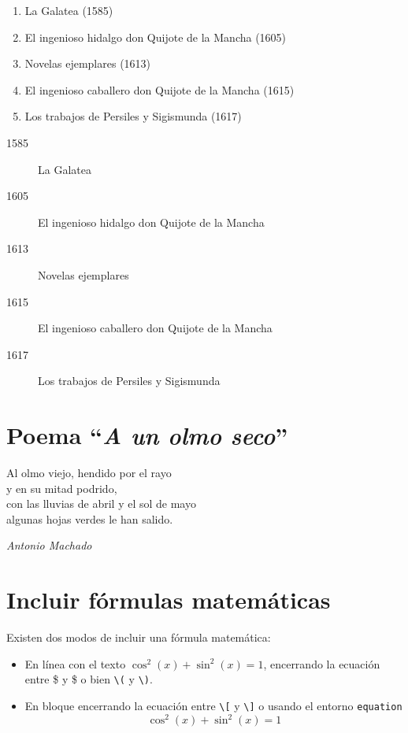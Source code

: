 \documentclass[a4paper, 12pt, twoside]{article} %
\begin{document}
\begin{enumerate}
  \item La Galatea (1585)
  \item El ingenioso hidalgo don Quijote de la Mancha (1605)
  \item Novelas ejemplares (1613)
  \item El ingenioso caballero don Quijote de la Mancha (1615)
  \item Los trabajos de Persiles y Sigismunda (1617)
\end{enumerate}

\begin{description}
  \item[1585] La Galatea 
  \item[1605] El ingenioso hidalgo don Quijote de la Mancha 
  \item[1613] Novelas ejemplares 
  \item[1615] El ingenioso caballero don Quijote de la Mancha 
  \item[1617] Los trabajos de Persiles y Sigismunda 
\end{description}
\section{Poema ``\emph{A un olmo seco}''}

\begin{flushleft}
Al olmo viejo, hendido por el rayo \\
y en su mitad podrido,\\
con las lluvias de abril y el sol de mayo\\
algunas hojas verdes le han salido.
\medskip

\emph{Antonio Machado}~\cite{machadoAntologia}
\end{flushleft}

\section{Incluir fórmulas matemáticas}

Existen dos modos de incluir una fórmula matemática: 
\begin{itemize}
  \item En línea con el texto $\cos^2(x) + \sin^2(x) = 1$, encerrando la ecuación entre \$ y \$ o bien \verb+\(+ y \verb+\)+.
  \item En bloque encerrando la ecuación entre \verb+\[+ y \verb+\]+ o usando el entorno \texttt{equation}
    \[
    \cos^2(x) + \sin^2(x) = 1
    \] 
\end{itemize}
\end{document}
